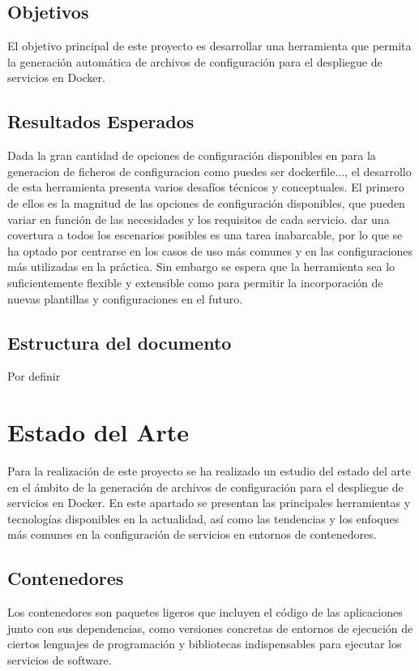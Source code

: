 \documentclass[12pt, a4paper, twoside]{article}
\begin{document}
\subsection{Objetivos}
El objetivo principal de este proyecto es desarrollar una herramienta que permita la generación automática de archivos de configuración para el despliegue de servicios en Docker.

\subsection{Resultados Esperados}
Dada la gran cantidad de opciones de configuración disponibles en para la generacion de ficheros de configuracion como puedes ser dockerfile..., el desarrollo de esta herramienta presenta varios desafíos técnicos y conceptuales.
El primero de ellos es la magnitud de las opciones de configuración disponibles, que pueden variar en función de las necesidades y los requisitos de cada servicio.
dar una covertura a todos los escenarios posibles es una tarea inabarcable, por lo que se ha optado por centrarse en los casos de uso más comunes y en las configuraciones más utilizadas en la práctica.
Sin embargo se espera que la herramienta sea lo suficientemente flexible y extensible como para permitir la incorporación de nuevas plantillas y configuraciones en el futuro.


\subsection{Estructura del documento}
Por definir










\section{Estado del Arte}
Para la realización de este proyecto se ha realizado un estudio del estado del arte en el ámbito de la generación de archivos de configuración para el despliegue de servicios en Docker.
En este apartado se presentan las principales herramientas y tecnologías disponibles en la actualidad, así como las tendencias y los enfoques más comunes en la configuración de servicios en entornos de contenedores.
\subsection{Contenedores}
Los contenedores son paquetes ligeros que incluyen el código de las aplicaciones junto con sus dependencias, como versiones concretas de entornos de ejecución de ciertos lenguajes de programación y bibliotecas indispensables para ejecutar los servicios de software.
\end{document}
